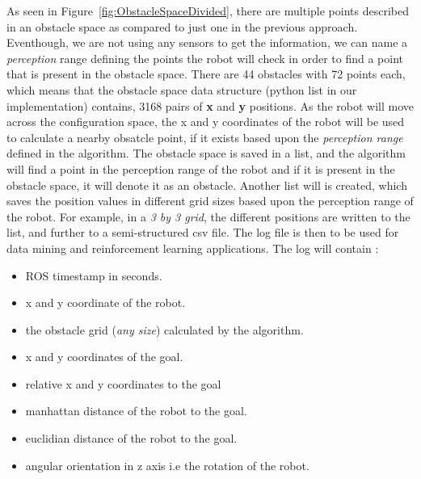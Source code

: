 As seen in Figure~\ref{fig:ObstacleSpaceDivided}, there are multiple points described in an obstacle space as compared to just one in the previous approach.
Eventhough, we are not using any sensors to get the information, we can name a \textit{perception} range defining the points the robot will check in order to find a point that is present in the obstacle space.
There are 44 obstacles with 72 points each, which means that the obstacle space data structure (python list in our implementation) contains, 3168 pairs of \textbf{x} and \textbf{y} positions.
As the robot will move across the configuration space, the x and y coordinates of the robot will be used to calculate a nearby obsatcle point, if it exists based upon the \textit{perception range} defined in the algorithm.
The obstacle space is saved in a list, and the algorithm will find a point in the perception range of the robot and if it is present in the obstacle space, it will denote it as an obstacle.
Another list will is created, which saves the position values in different grid sizes based upon the perception range of the robot. For example, in a \textit{3 by 3 grid}, the different positions are written to the list, and further to a semi-structured csv file. The log file is then to be used for data mining and reinforcement learning applications.
The log will contain :  

\begin{itemize}
    \item ROS timestamp in seconds.
    \item x and y coordinate of the robot.
    \item the obstacle grid (\textit{any size}) calculated by the algorithm.
    \item x and y coordinates of the goal.
    \item relative x and y coordinates to the goal
    \item manhattan distance of the robot to the goal.
    \item euclidian distance of the robot to the goal.
    \item angular orientation in z axis i.e the rotation of the robot.
\end{itemize}

